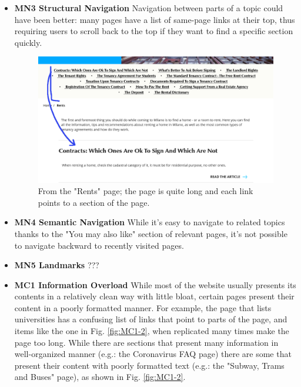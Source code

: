 \begin{itemize}
    \item \textbf{MN3 Structural Navigation}
    Navigation between parts of a topic could have been better: many pages have a list of same-page links at their top, thus requiring users to scroll back to the top if they want to find a specific section quickly. 

    \begin{figure}[!ht]
        \includegraphics[width=\linewidth]{images/MN3-1.png}
        \caption{From the "Rents" page; the page is quite long and each link points to a section of the page.}
        \label{fig:MN3-1}
    \end{figure}
      
    \item \textbf{MN4 Semantic Navigation}
    While it's easy to navigate to related topics thanks to the "You may also like" section of relevant pages, it's not possible to navigate backward to recently visited pages.

    \item \textbf{MN5 Landmarks}
    ???
    
    \item \textbf{MC1 Information Overload}
    While most of the website usually presents its contents in a relatively clean way with little bloat, certain pages present their content in a poorly formatted manner. 
    For example, the page that lists universities has a confusing list of links that point to parts of the page, and items like the one in Fig. \ref{fig:MC1-2}, when replicated many times make the page too long.
    While there are sections that present many information in well-organized manner (e.g.: the Coronavirus FAQ page) there are some that present their content with poorly formatted text (e.g.: the "Subway, Trams and Buses" page), as shown in Fig. \ref{fig:MC1-2}.



\end{itemize}
